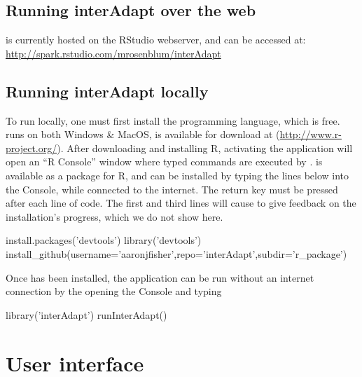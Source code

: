 \documentclass[article]{jss}
\begin{document}
\subsection{Running interAdapt over the web}
\label{sub:running-online}

 is currently hosted on the RStudio webserver, and can be accessed at:\\
\url{http://spark.rstudio.com/mrosenblum/interAdapt}

\subsection{Running interAdapt locally}
\label{sub:running-locally}



To run  locally, one must first install the  programming language, which is free.  runs on both Windows \& MacOS, is available for download at (\url{http://www.r-project.org/}). After downloading and installing R, activating the  application will open an ``R Console'' window where typed commands are executed by .  is available as a package for R, and can be installed by typing the lines below into the  Console, while connected to the internet. The return key must be pressed after each line of code. The first and third lines will cause  to give feedback on the installation's progress, which we do not show here.

\vspace{5 mm}
\begin{Code}
install.packages('devtools')
library('devtools')
install_github(username='aaronjfisher',repo='interAdapt',subdir='r_package')
\end{Code}
\vspace{5 mm}

Once  has been installed, the application can be run without an internet connection by the opening the  Console and typing

\vspace{5 mm}
\begin{Code}
library('interAdapt')
runInterAdapt()
\end{Code}
\vspace{5 mm}




\section{User interface}
\label{sec:UI}
\end{document}
